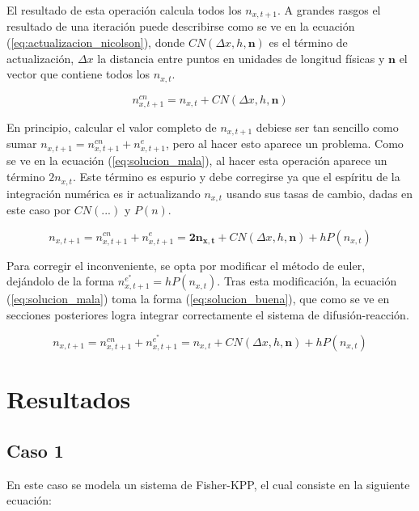 \documentclass{article}
\begin{document}
El resultado de esta operación calcula todos los $n_{x,t+1}$. A grandes rasgos el resultado de una iteración puede describirse como se ve en la ecuación (\ref{eq:actualizacion_nicolson}), donde $CN( \Delta x, h, \mathbf{n} )$ es el término de actualización, $\Delta x$ la distancia entre puntos en unidades de longitud físicas y $\mathbf{n}$ el vector que contiene todos los $n_{x,t}$.

\begin{equation}
  n_{x,t+1}^{cn} = n_{x,t} + CN( \Delta x, h, \mathbf{n} )
  \label{eq:actualizacion_nicolson}
\end{equation} 

En principio, calcular el valor completo de $n_{x,t+1}$ debiese ser tan sencillo como sumar $n_{x,t+1} = n_{x,t+1}^{cn} + n_{x,t+1}^{e}$, pero al hacer esto aparece un problema. Como se ve en la ecuación (\ref{eq:solucion_mala}), al hacer esta operación aparece un término $2n_{x,t}$. Este término es espurio y debe corregirse ya que el espíritu de la integración numérica es ir actualizando $n_{x,t}$ usando sus tasas de cambio, dadas en este caso por $CN(...)$ y $P(n)$. 

\begin{equation}
  n_{x,t+1} = n_{x,t+1}^{cn} + n_{x,t+1}^{e} = \mathbf{2n_{x,t}} + CN( \Delta x, h, \mathbf{n} ) + h P(n_{x,t})
  \label{eq:solucion_mala}
\end{equation}

Para corregir el inconveniente, se opta por modificar el método de euler, dejándolo de la forma $n_{x,t+1}^{e^*} = h P(n_{x,t})$. Tras esta modificación, la ecuación (\ref{eq:solucion_mala}) toma la forma (\ref{eq:solucion_buena}), que como se ve en secciones posteriores logra integrar correctamente el sistema de difusión-reacción.

\begin{equation}
  n_{x,t+1} = n_{x,t+1}^{cn} + n_{x,t+1}^{e^*} = n_{x,t} + CN( \Delta x, h, \mathbf{n} ) + h P(n_{x,t})
\label{eq:solucion_buena}
\end{equation}

\section{Resultados}

\subsection{Caso 1}

En este caso se modela un sistema de Fisher-KPP, el cual consiste en la siguiente ecuación:
\end{document}
